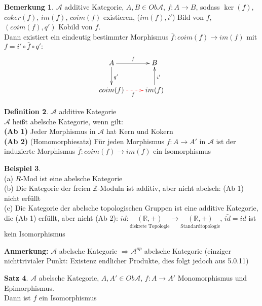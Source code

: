 \documentclass[10pt,a4paper,numbers=endperiod]{scrreprt}
\theoremstyle{definition}
\newtheorem{satz}{Satz}[section]
\newtheorem{defi}[satz]{Definition}
\newtheorem{bem}[satz]{Bemerkung}
\newtheorem{bsp}[satz]{Beispiel}
\def\RR{{\mathbb R}}
\def\ZZ{{\mathbb Z}}
\begin{document}
\begin{bem}
	$\mathcal{A}$ additive Kategorie, $A, B \in Ob \mathcal{A}$, $f: A \to B$, sodass $\ker(f)$, $coker(f)$, $im(f)$, $coim(f)$ existieren, ($im(f), i'$) Bild von $f$, $(coim(f), q')$ Kobild von $f$.\\
	Dann existiert ein eindeutig bestimmter Morphismus $\bar{f}: coim(f) \to im(f)$ mit $f = i' \circ \bar{f} \circ q':$ \begin{align*}
	\begin{xy}
	\xymatrix{
		A \ar[r]^f \ar[d]^{q'}  & B \\
		coim(f) \ar@[red]@{.>}[r]_f & im(f) \ar[u]_{i'}	
	}
	\end{xy}
	\end{align*}
\end{bem}

\begin{defi}
	$\mathcal{A}$ additive Kategorie\\
	$\mathcal{A}$ heißt abelsche Kategorie, wenn gilt:\\
	\textbf{(Ab 1)} Jeder Morphismus in $\mathcal{A}$ hat Kern und Kokern\\
	\textbf{(Ab 2)} (Homomorphiesatz) Für jeden Morphismus $f: A \to A'$ in $\mathcal{A}$ ist der induzierte Morphismus $\bar{f}: coim(f) \to im(f)$ ein Isomorphismus
\end{defi}

\begin{bsp}
	$ $\\
	(a) $R$-Mod ist eine abelsche Kategorie\\
	(b) Die Kategorie der freien $\ZZ$-Moduln ist additiv, aber nicht abelsch: (Ab 1) nicht erfüllt\\
	(c) Die Kategorie der abelsche topologischen Gruppen ist eine additive Kategorie, die (Ab 1) erfüllt, aber nicht (Ab 2): $id: \underset{\text{diskrete Topologie}}{(\RR, +)} \to \underset{\text{Standardtopologie}}{(\RR, +)}$, $\bar{id} = id$ ist kein Isomorphismus
\end{bsp}

\textbf{Anmerkung:} $\mathcal{A}$ abelsche Kategorie $\Rightarrow \mathcal{A}^{op}$ abelsche Kategorie (einziger nichttrivialer Punkt: Existenz endlicher Produkte, dies folgt jedoch aus 5.0.11)

\begin{satz}
	$\mathcal{A}$ abelsche Kategorie, $A, A' \in Ob \mathcal{A}$, $f: A \to A'$ Monomorphismus und Epimorphismus.\\
	Dann ist $f$ ein Isomorphismus
\end{satz}
\end{document}
